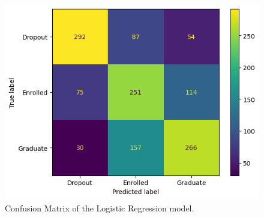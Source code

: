 \documentclass[12pt]{article}
\begin{document}
\begin{figure} [H]
  \centering
  \includegraphics[width=0.8\linewidth]{logist_confusion}
  \caption{Confusion Matrix of the Logistic Regression model.}\label{fig:logist_confusion}
\end{figure}  

\printbibliography[heading=bibintoc, title={References}]
\end{document}
